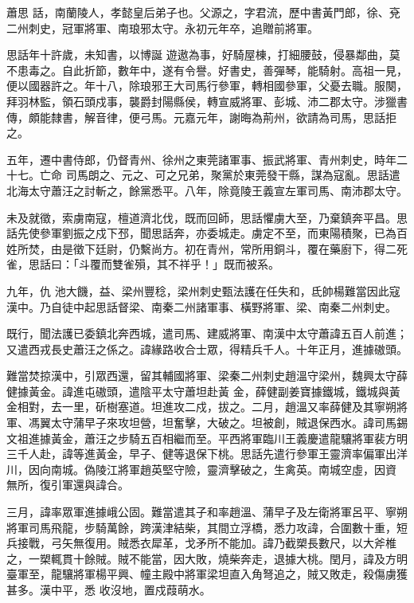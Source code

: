 
\begin{pinyinscope}

 蕭思
 話，南蘭陵人，孝懿皇后弟子也。父源之，字君流，歷中書黃門郎，徐、兗二州刺史，冠軍將軍、南琅邪太守。永初元年卒，追贈前將軍。



 思話年十許歲，未知書，以博誕
 遊遨為事，好騎屋棟，打細腰鼓，侵暴鄰曲，莫不患毒之。自此折節，數年中，遂有令譽。好書史，善彈琴，能騎射。高祖一見，便以國器許之。年十八，除琅邪王大司馬行參軍，轉相國參軍，父憂去職。服闋，拜羽林監，領石頭戍事，襲爵封陽縣侯，轉宣威將軍、彭城、沛二郡太守。涉獵書傳，頗能隸書，解音律，便弓馬。元嘉元年，謝晦為荊州，欲請為司馬，思話拒之。



 五年，遷中書侍郎，仍督青州、徐州之東莞諸軍事、振武將軍、青州刺史，時年二十七。亡命
 司馬朗之、元之、可之兄弟，聚黨於東莞發干縣，謀為寇亂。思話遣北海太守蕭汪之討斬之，餘黨悉平。八年，除竟陵王義宣左軍司馬、南沛郡太守。



 未及就徵，索虜南寇，檀道濟北伐，既而回師，思話懼虜大至，乃棄鎮奔平昌。思話先使參軍劉振之戍下邳，聞思話奔，亦委城走。虜定不至，而東陽積聚，已為百姓所焚，由是徵下廷尉，仍繫尚方。初在青州，常所用銅斗，覆在藥廚下，得二死雀，思話曰：「斗覆而雙雀殞，其不祥乎！」既而被系。



 九年，仇
 池大饑，益、梁州豐稔，梁州刺史甄法護在任失和，氐帥楊難當因此寇漢中。乃自徒中起思話督梁、南秦二州諸軍事、橫野將軍、梁、南秦二州刺史。



 既行，聞法護已委鎮北奔西城，遣司馬、建威將軍、南漢中太守蕭諱五百人前進；又遣西戎長史蕭汪之係之。諱緣路收合士眾，得精兵千人。十年正月，進據磝頭。



 難當焚掠漢中，引眾西還，留其輔國將軍、梁秦二州刺史趙溫守梁州，魏興太守薛健據黃金。諱進屯磝頭，遣陰平太守蕭坦赴黃
 金，薛健副姜寶據鐵城，鐵城與黃金相對，去一里，斫樹塞道。坦進攻二戍，拔之。二月，趙溫又率薛健及其寧朔將軍、馮翼太守蒲早子來攻坦營，坦奮擊，大破之。坦被創，賊退保西水。諱司馬錫文祖進據黃金，蕭汪之步騎五百相繼而至。平西將軍臨川王義慶遣龍驤將軍裴方明三千人赴，諱等進黃金，早子、健等退保下桃。思話先遣行參軍王靈濟率偏軍出洋川，因向南城。偽陵江將軍趙英堅守險，靈濟擊破之，生禽英。南城空虛，因資
 無所，復引軍還與諱合。



 三月，諱率眾軍進據峨公固。難當遣其子和率趙溫、蒲早子及左衛將軍呂平、寧朔將軍司馬飛龍，步騎萬餘，跨漢津結柴，其間立浮橋，悉力攻諱，合圍數十重，短兵接戰，弓矢無復用。賊悉衣犀革，戈矛所不能加。諱乃截槊長數尺，以大斧椎之，一槊輒貫十餘賊。賊不能當，因大敗，燒柴奔走，退據大桃。閏月，諱及方明臺軍至，龍驤將軍楊平興、幢主殿中將軍梁坦直入角弩追之，賊又敗走，殺傷虜獲甚多。漢中平，悉
 收沒地，置戍葭萌水。




\end{pinyinscope}
